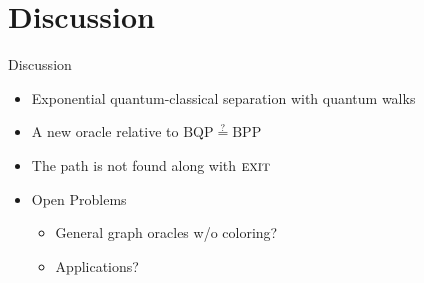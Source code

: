 \documentclass{beamer}
\newcommand{\<}{\langle}
\renewcommand{\>}{\rangle}
\newcommand{\BPP}{{\mathrm{BPP}}}
\newcommand{\BQP}{{\mathrm{BQP}}}
\newcommand{\exit}{{\textsc{exit}}}
\begin{document}

\section{Discussion}\label{sec:discussion}


\begin{frame}{Discussion}
    \begin{itemize}
        \item Exponential quantum-classical separation with quantum walks
        \item A new oracle relative to $\BQP \overset{?}= \BPP$
        \item The path is not found along with $\exit$ 
        \item Open Problems
            \begin{itemize}
                \item General graph oracles w/o coloring?
                \item Applications?
            \end{itemize}
    \end{itemize}
\end{frame}

\end{document}
